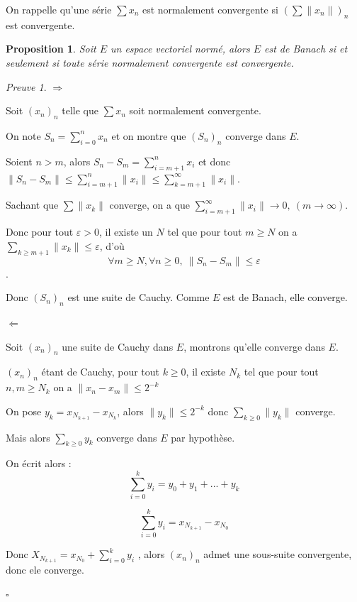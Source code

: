 \documentclass[]{article}
\newtheorem{myproposition}{Proposition}
\theoremstyle{remark}
\newtheorem{myproof}{Preuve}
\theoremstyle{definition}
\newcommand{\cqfd}{
	\hfill$\square$
}
\newenvironment{proofpart}[1]{
	\noindent
	{\textbf{\boldmath #1}}
}{
	\checkmark
}
\begin{document}
On rappelle qu'une série $\sum x_n$ est normalement convergente si $\left(\sum \|x_n\|\right)_n$ est convergente.

\begin{myproposition}
	Soit $E$ un espace vectoriel normé, alors $E$ est de Banach si et seulement si toute série normalement convergente est convergente.
\end{myproposition}

\begin{myproof}
	\begin{proofpart}{$\Longrightarrow$}
	Soit $(x_n)_n$ telle que $\sum x_n$ soit normalement convergente.
	
	On note $\displaystyle S_n = \sum_{i = 0}^{n} x_n$ et on montre que $(S_n)_n$ converge dans $E$.
	
	Soient $n > m$, alors $\displaystyle S_n - S_m = \sum_{i = m + 1}^{n} x_i$ et donc $\displaystyle \|S_n - S_m\| \leqslant \sum_{i = m+1}^{n} \|x_i\| \leqslant \sum_{k = m + 1}^{\infty}\|x_i\|$.
	
	Sachant que $\sum \|x_k\|$ converge, on a que $\displaystyle \sum_{i = m + 1}^{\infty} \|x_i\| \longrightarrow 0, ~ (m \rightarrow \infty)$.
	
	Donc pour tout $\varepsilon > 0$, il existe un $N$ tel que pour tout $m \geqslant N$ on a $\displaystyle \sum_{k \geqslant m+1} \|x_k\| \leqslant \varepsilon$, d'où $$\forall m \geqslant N, \forall n \geqslant 0, ~ \|S_n - S_m\| \leqslant \varepsilon$$.
	
	Donc $(S_n)_n$ est une suite de Cauchy. Comme $E$ est de Banach, elle converge.
	\end{proofpart}
	
	\begin{proofpart}{$\Longleftarrow$}
		Soit $(x_n)_n$ une suite de Cauchy dans $E$, montrons qu'elle converge dans $E$.
		
		$(x_n)_n$ étant de Cauchy, pour tout $k \geqslant 0$, il existe $N_k$ tel que pour tout$n, m \geqslant N_k$ on a $\|x_n - x_m\| \leqslant 2^{-k}$
		
		On pose $y_k = x_{N_{k+1}} - x_{N_k}$, alors $\|y_k\| \leqslant 2^{-k}$ donc $\displaystyle \sum_{k \geqslant 0} \|y_k\|$ converge.
		
		Mais alors $\sum_{k \geqslant 0} y_k$ converge dans $E$ par hypothèse.
		
		On écrit alors : $$\sum_{i = 0}^{k} y_i = y_0 + y_1 + ... + y_k$$
		
		$$\sum_{i = 0}^{k} y_i = x_{N_{k+1}} - x_{N_0}$$
		
		Donc $\displaystyle X_{N_{k+1}} = x_{N_0} + \sum_{i=0}^k y_i$ , alors $(x_n)_n$ admet une sous-suite convergente, donc ele converge.
	\end{proofpart}

	\cqfd
\end{myproof}
\end{document}
